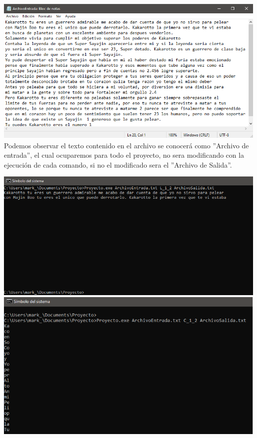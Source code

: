 \documentclass[12pt,letterpaper]{report}
\begin{document}
\begin{multicols}{2}
\includegraphics[scale=0.35]{ArchivoEntrada}\\
Podemos observar el texto contenido en el archivo se conocerá como ''Archivo de entrada'', el cual ocuparemos para todo el proyecto, no sera modificando con la ejecución de cada comando, si no el modificado sera el ''Archivo de Salida''.
\end{multicols}


\begin{multicols}{2}
\includegraphics[scale=0.35]{Salida1}
\includegraphics[scale=0.35]{Salida2}
\end{multicols}
\end{document}
